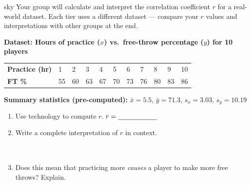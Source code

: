 \documentclass[10pt]{article}
\begin{document}
\namepartnerperiod

\vspace{0.14in}

\begin{scenariobox}[Context]{sky}
\small
Your group will calculate and interpret the correlation coefficient $r$ for a real-world
dataset. Each tier uses a different dataset --- compare your $r$ values and interpretations
with other groups at the end.
\end{scenariobox}

\vspace{0.1in}

\begin{tcolorbox}[colback=white, colframe=black!40, boxrule=0.8pt, arc=2mm,
    left=4mm, right=4mm, top=3mm, bottom=3mm,
    title={\textbf{Tier R --- Remediate}}, fonttitle=\bfseries, halign title=center]
\small

\textbf{Dataset: Hours of practice ($x$) vs.\ free-throw percentage ($y$) for 10 players}

\vspace{6pt}
\renewcommand{\arraystretch}{1.4}
\begin{tabularx}{\linewidth}{@{} l *{10}{C{0.82cm}} @{}}
\textbf{Practice (hr)} & 1 & 2 & 3 & 4 & 5 & 6 & 7 & 8 & 9 & 10 \\
\textbf{FT \%}         & 55 & 60 & 63 & 67 & 70 & 73 & 76 & 80 & 83 & 86 \\
\end{tabularx}

\vspace{4pt}
\textbf{Summary statistics (pre-computed):}
$\bar{x} = 5.5$,\; $\bar{y} = 71.3$,\; $s_x = 3.03$,\; $s_y = 10.19$

\vspace{10pt}
\begin{enumerate}[leftmargin=1.6em, itemsep=0.16in]
  \item Use technology to compute $r$. \quad $r = \blank{2cm}$
  \item Write a complete interpretation of $r$ in context.\\[6pt]
        \writeline\\[2pt]\writeline\\[2pt]\writeline
  \item Does this mean that practicing more \emph{causes} a player to make more
        free throws? Explain.\\[6pt]
        \writeline\\[2pt]\writeline
\end{enumerate}
\end{tcolorbox}
\end{document}
